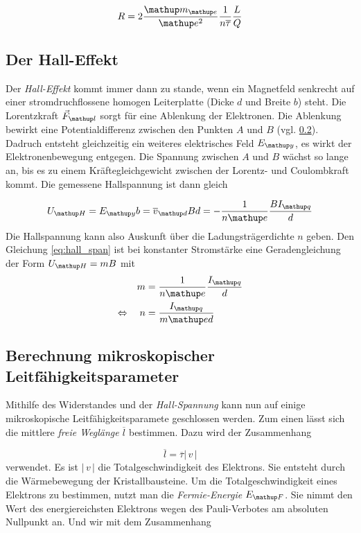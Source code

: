 \begin{equation}
\label{eq:wider}
R=2\frac{\map{m}\ua{e}}{\map{e}^2}\frac{1}{n\overline{\tau}}\frac{L}{Q}
\end{equation}
\subsection{Der Hall-Effekt}
Der \emph{Hall-Effekt} kommt immer dann zu stande, wenn %
ein Magnetfeld senkrecht auf einer stromdruchflossene %
homogen Leiterplatte (Dicke $d$ und Breite $b$) steht.
Die Lorentzkraft $\vec{F}\ua{l}$ sorgt für eine Ablenkung der Elektronen.
Die Ablenkung bewirkt eine Potentialdifferenz zwischen den
Punkten $A$ und $B$ (vgl. \ref{}). Dadruch entsteht gleichzeitig ein %
weiteres elektrisches Feld $E\ua{y}$, es wirkt der Elektronenbewegung entgegen. %
Die Spannung zwischen $A$ und $B$ wächst so lange an, bis es zu einem Kräftegleichgewicht zwischen der Lorentz- und Coulombkraft kommt.
Die gemessene Hallspannung ist dann gleich %

\begin{equation}
\label{eq:hall_span}
U\ua{H}=E\ua{y}b=\overline{v}\ua{d}Bd=-\frac{1}{n\map{e}}\frac{BI\ua{q}}{d}
\end{equation}
Die Hallspannung kann also Auskunft über die Ladungsträgerdichte $n$ geben.
Den Gleichung \eqref{eq:hall_span} ist bei konstanter Stromstärke eine Geradengleichung der Form $U\ua{H}=mB$ mit %
\begin{align}
m&=\frac{1}{n\map{e}}\frac{I\ua{q}}{d} \notag \\
\Leftrightarrow \quad n&=\frac{I\ua{q}}{m\map{e}d}\label{eq:steig_teil_anz}
\end{align}


\subsection{Berechnung mikroskopischer Leitfähigkeitsparameter}
Mithilfe des Widerstandes und der \emph{Hall-Spannung} kann nun auf
einige mikroskopische Leitfähigkeitsparamete geschlossen werden.
Zum einen lässt sich die mittlere \emph{freie Weglänge} $\overline{l}$ bestimmen.
Dazu wird der Zusammenhang

\begin{equation*}
\label{eq:freie_weg}
\overline{l}=\overline{\tau}\left|\,v\,\right|
\end{equation*}
verwendet.
Es ist $\left|\,v\,\right|$ die Totalgeschwindigkeit des Elektrons.
Sie entsteht durch die Wärmebewegung der Kristallbausteine.
Um die Totalgeschwindigkeit eines Elektrons zu bestimmen, nutzt
man die \emph{Fermie-Energie} $E\ua{F}$. Sie nimmt den Wert des energiereichsten Elektrons wegen des
Pauli-Verbotes am absoluten Nullpunkt an.
Und wir mit dem Zusammenhang %

